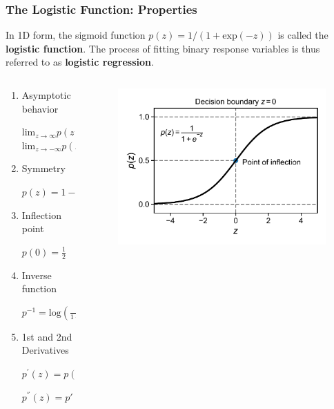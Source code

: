 \documentclass[10pt,aspectratio=169]{beamer}
\begin{document}
\begin{frame}
  \frametitle{The Logistic Function: Properties}
  
  In 1D form, the sigmoid function $p(z) = 1/(1 + \mathrm{exp}(-z))$ is called
  the \textbf{logistic function}. The process of fitting binary
  response variables is thus referred to as \textbf{logistic
    regression}.

    \begin{columns}[T]
      \begin{column}{0.5\textwidth}
        \begin{enumerate}
        \item Asymptotic behavior
          
          $\mathrm{lim}_{z\to\infty} p(z) = 1$ $\mathrm{lim}_{z\to-\infty} p(z) = 0$
          
        \item Symmetry

          $p(z) = 1 - p(-z)$
          
        \item Inflection point

          $p(0) = \frac{1}{2}$
          
        \item Inverse function

          $p^{-1} = \mathrm{log}(\frac{p}{1 - p})$

        \item 1st and 2nd Derivatives

          $p^{'}(z) = p(z)(1 - p(z))$

          $p^{''}(z) = p'(z)(1 - 2 p(z))$
        \end{enumerate}
      \end{column}

      \begin{column}{0.5\textwidth}

        \begin{figure}[t]
          \includegraphics[width=\textwidth]{scripts/logistic_fun_alone.pdf}
        \end{figure}
        

\end{column}
\end{columns}
\end{frame}
\end{document}
